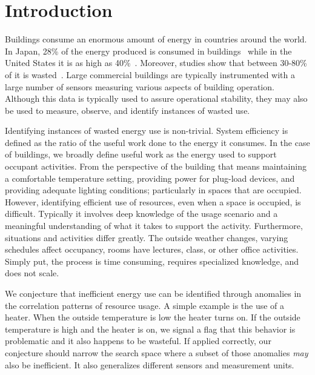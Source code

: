 \section{Introduction}
Buildings consume an enormous amount of energy in countries around the world.  In 
Japan, 28\% of the energy produced is consumed in buildings~\cite{japanbuildings} while in the United 
States it is as high as 40\%~\cite{epabuildings}.  Moreover, studies show that between 30-80\% of it
is wasted~\cite{waste_science, next10_waste}.  Large commercial buildings are typically instrumented
with a large number of sensors measuring various aspects of building operation.  Although this data is
typically used to assure operational stability, they may also be used to measure, observe, and identify
instances of wasted use.

Identifying instances of wasted energy use is non-trivial.  System efficiency is defined as the ratio of the 
useful work done to the energy it consumes.  In the case of buildings, we broadly define useful work as 
the energy used to support occupant activities.  From the perspective of the building that means maintaining
a comfortable temperature setting, providing power for plug-load devices, and providing adequate lighting
conditions; particularly in spaces that are occupied.  However, identifying efficient use of resources,
even when a space is occupied, is difficult.  Typically it involves deep knowledge of the usage scenario and
a meaningful understanding of what it takes to support the activity.  Furthermore, situations and activities differ
greatly.  The outside weather changes, varying schedules affect occupancy, rooms have lectures, class,
or other office activities.  Simply put, the process is time consuming, requires specialized knowledge,
and does not scale.

We conjecture that inefficient energy use can be identified through anomalies in the correlation
patterns of resource usage.  A simple example is the use of a heater.  When the outside temperature is low
the heater turns on.  If the outside temperature is high and the heater is on, we signal a flag that this
behavior is problematic and it also happens to be wasteful.  If applied correctly, our conjecture should narrow
the search space where a subset of those anomalies \emph{may} also be inefficient.
It also generalizes different sensors and measurement units.  

